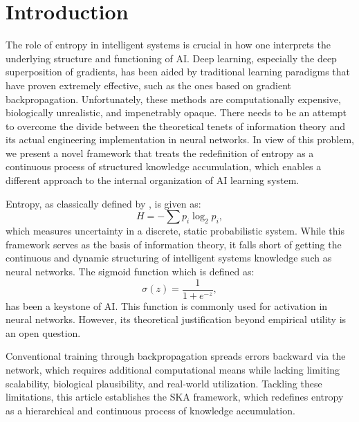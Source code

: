 \documentclass{article}
\begin{document}


\section{Introduction}
The role of entropy in intelligent systems is crucial in how one interprets the underlying structure and functioning of AI. Deep learning, especially the deep superposition of gradients, has been aided by traditional learning paradigms that have proven extremely effective, such as the ones based on gradient backpropagation. Unfortunately, these methods are computationally expensive, biologically unrealistic, and impenetrably opaque. There needs to be an attempt to overcome the divide between the theoretical tenets of information theory and its actual engineering implementation in neural networks. In view of this problem, we present a novel framework that treats the redefinition of entropy as a continuous process of structured knowledge accumulation, which enables a different approach to the internal organization of AI learning system.

Entropy, as classically defined by \cite{shannon1949mathematical}, is given as:
\begin{equation}\label{eq1}
H = - \sum p_i \log_2 p_i,
\end{equation}
which measures uncertainty in a discrete, static probabilistic system. While this framework serves as the basis of information theory, it falls short of getting the continuous and dynamic structuring of intelligent systems knowledge such as neural networks. The sigmoid function which is defined as:
\begin{equation}
\sigma(z) = \frac{1}{1+e^{-z}},
\end{equation}
has been a keystone of AI. This function is commonly used for activation in neural networks. However, its theoretical justification beyond empirical utility is  an open question.

Conventional training through backpropagation spreads errors backward via the network, which requires additional computational means while lacking limiting scalability, biological plausibility, and real-world utilization. Tackling these limitations, this article establishes the SKA framework, which redefines entropy as a hierarchical and continuous process of knowledge accumulation.
\end{document}
